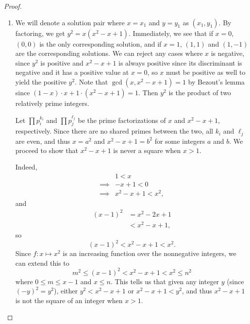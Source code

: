 \documentclass[12pt]{article}
\theoremstyle{definition}
\begin{document}
\begin{proof}
\begin{enumerate}[label=(\alph*)]
		      and \begin{align*}
			               & 2w - 2x + 1 = -3 \\
			               & 2w + 2x - 1 = -1 \\
			      \implies & 4x - 2 = 2       \\
			      \implies & x = 1,
		      \end{align*}
		      so the only integer solutions have $x=0$ or $x=1$.
		\item We will denote a solution pair where $x = x_1$ and $y = y_1$ as $(x_1, y_1)$.
		      By factoring, we get $y^2 = x(x^2 - x + 1)$.
          Immediately, we see that if $x = 0$, $(0, 0)$ is the only corresponding solution, and if $x = 1$, $(1, 1)$ and $(1, -1)$ are the corresponding solutions.
		      We can reject any cases where $x$ is negative, since $y^2$ is positive and $x^2 - x + 1$ is always positive since its discriminant is negative and it has a positive value at $x = 0$, so $x$ must be positive as well to yield the positive $y^2$.
		      Note that $\gcd(x, x^2 - x + 1) = 1$ by Bezout's lemma since $(1 - x)\cdot x + 1 \cdot (x^2 - x + 1) = 1$.
		      Then $y^2$ is the product of two relatively prime integers.

		      Let $\prod p_i^{k_i}$ and $\prod p_j^{\ell_j}$ be the prime factorizations of $x$ and $x^2 - x + 1$, respectively.
		      Since there are no shared primes between the two, all $k_i$ and $\ell_j$ are even, and thus $x = a^2$ and $x^2-x+1 = b^2$ for some integers $a$ and $b$.
		      We proceed to show that $x^2 - x + 1$ is never a square when $x > 1$.

		      Indeed, \begin{align*}
			               & 1 < x              \\
			      \implies & -x + 1 < 0         \\
			      \implies & x^2 - x + 1 < x^2,
		      \end{align*}
		      and \begin{align*}
			      (x-1)^2 & = x^2 - 2x + 1   \\
			              & < x^2 - x + 1,
		      \end{align*}
          so \begin{equation*}
            (x-1)^2 < x^2 - x + 1 < x^2.
          \end{equation*}
          Since $f: x \mapsto x^2$ is an increasing function over the nonnegative integers, we can extend this to \begin{equation*}
            m^2 \leq (x-1)^2 < x^2 - x + 1 < x^2 \leq n^2
          \end{equation*}
          where $0 \leq m \leq x-1$ and $x \leq n$.
          This tells us that given any integer $y$ (since $(-y)^2 = y^2$), either $y^2 < x^2 - x + 1$ or $x^2 - x + 1 < y^2$, and thus $x^2 - x + 1$ is not the square of an integer when $x > 1$.


\end{enumerate}
\end{proof}
\end{document}
